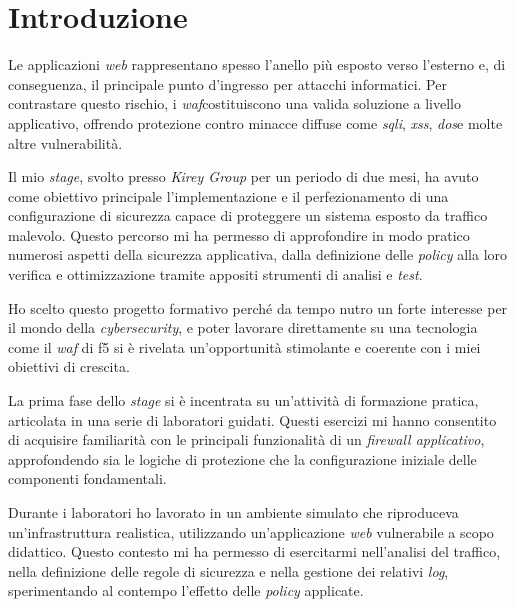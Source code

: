 %     
%     
%     

\chapter{Introduzione}
\label{cap:1introduzione}

Le applicazioni \emph{web} rappresentano spesso l'anello più esposto verso l'esterno e, di conseguenza, il principale punto d'ingresso per attacchi informatici. Per contrastare questo rischio, i \emph{\gls{waf}}\glsfirstoccur costituiscono una valida soluzione a livello applicativo, offrendo protezione contro minacce diffuse come \emph{\gls{sqli}}\glsfirstoccur, \emph{\gls{xss}}\glsfirstoccur, \emph{\gls{dos}}\glsfirstoccur e molte altre vulnerabilità.

Il mio \emph{stage}, svolto presso \emph{Kirey Group} per un periodo di due mesi, ha avuto come obiettivo principale l'implementazione e il perfezionamento di una configurazione di sicurezza capace di proteggere un sistema esposto da traffico malevolo. Questo percorso mi ha permesso di approfondire in modo pratico numerosi aspetti della sicurezza applicativa, dalla definizione delle \emph{\gls{policy}} alla loro verifica e ottimizzazione tramite appositi strumenti di analisi e \emph{test}.

Ho scelto questo progetto formativo perché da tempo nutro un forte interesse per il mondo della \emph{cybersecurity}, e poter lavorare direttamente su una tecnologia come il \emph{\gls{waf}} di \gls{f5} si è rivelata un'opportunità stimolante e coerente con i miei obiettivi di crescita.

La prima fase dello \emph{stage} si è incentrata su un'attività di formazione pratica, articolata in una serie di laboratori guidati. Questi esercizi mi hanno consentito di acquisire familiarità con le principali funzionalità di un \emph{firewall applicativo}, approfondendo sia le logiche di protezione che la configurazione iniziale delle componenti fondamentali.

Durante i laboratori ho lavorato in un ambiente simulato che riproduceva un'infrastruttura realistica, utilizzando un'applicazione \emph{web} vulnerabile a scopo didattico. Questo contesto mi ha permesso di esercitarmi nell'analisi del traffico, nella definizione delle regole di sicurezza e nella gestione dei relativi \emph{\gls{log}}, sperimentando al contempo l'effetto delle \emph{\gls{policy}} applicate.

